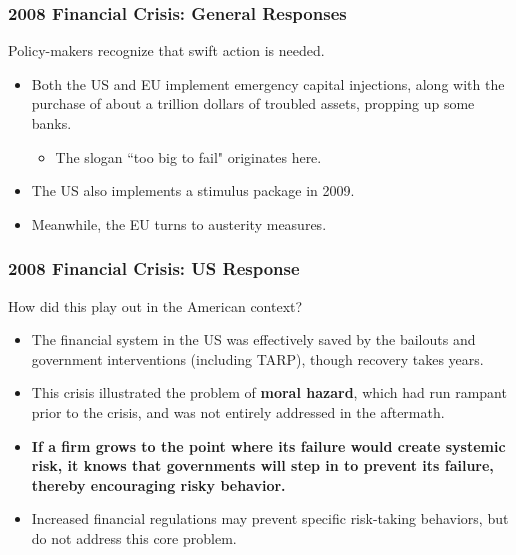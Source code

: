 \documentclass[handout]{beamer}
\begin{document}
\begin{frame} 
	\frametitle{\LARGE{2008 Financial Crisis: General Responses}}
	Policy-makers recognize that swift action is needed.
	\begin{itemize}
		\item Both the US and EU implement emergency capital injections, along with the purchase of about a trillion dollars of troubled assets, propping up some banks. \pause
		\begin{itemize}
			\item The slogan ``too big to fail" originates here. \pause
		\end{itemize}
		\item The US also implements a stimulus package in 2009. \pause
		\item Meanwhile, the EU turns to austerity measures.
	\end{itemize}
\end{frame}

\begin{frame} 
	\frametitle{\LARGE{2008 Financial Crisis: US Response}}
	How did this play out in the American context? \pause
	\begin{itemize}
		\item The financial system in the US was effectively saved by the bailouts and government interventions (including TARP), though recovery takes years. \pause
		
		\item This crisis illustrated the problem of \textbf{moral hazard}, which had run rampant prior to the crisis, and was not entirely addressed in the aftermath. \pause
		
		\item \textbf{If a firm grows to the point where its failure would create systemic risk, it knows that governments will step in to prevent its failure, thereby encouraging risky behavior.} \pause
		
		\item Increased financial regulations may prevent specific risk-taking behaviors, but do not address this core problem.
		
		
	\end{itemize}
\end{frame}
\end{document}
